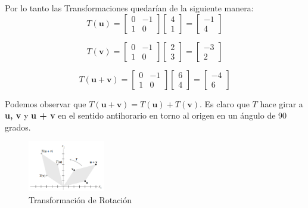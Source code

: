 \documentclass[12 pt]{article}
\begin{document}
Por lo tanto las Transformaciones quedarían de la siguiente manera: 
$$T(\mathbf{u}) = \left[\begin{array}{rr}
    0 & -1 \\
    1 & 0
\end{array}\right] \begin{bmatrix}
    4 \\ 1
\end{bmatrix} = \left[\begin{array}{r}
    -1 \\ 4
\end{array}\right]$$

$$T(\mathbf{v}) = \left[\begin{array}{rr}
    0 & -1 \\
    1 & 0
\end{array}\right] \begin{bmatrix}
    2 \\ 3
\end{bmatrix} = \left[\begin{array}{r}
    -3 \\ 2
\end{array}\right]$$

$$T(\mathbf{u + v}) = \left[\begin{array}{rr}
    0 & -1 \\
    1 & 0
\end{array}\right] \begin{bmatrix}
    6 \\ 4
\end{bmatrix} = \left[\begin{array}{r}
    -4 \\ 6
\end{array}\right]$$

Podemos observar que $T(\mathbf{u + v}) = T(\mathbf{u}) + T(\mathbf{v})$. Es claro que $T$ hace girar a \textbf{u, v} y \textbf{u + v} en el sentido antihorario en torno al origen en un ángulo de 90 grados. \cite{DavidC}

\begin{figure}[ht]
  \centerline{\includegraphics[width=0.3\textwidth]{image21.png}}
  \caption{Transformación de Rotación}
\end{figure}
\end{document}
